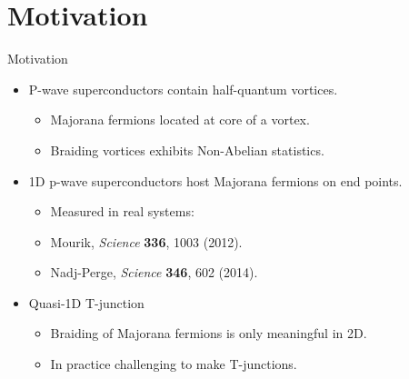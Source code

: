 \documentclass[xcolor=dvipsnames,10pt,aspectratio=169]{beamer}
\newcommand{\MO}{Motivation}
\begin{document}
  \section{\MO}
  \begin{frame}{\MO}{}

    \begin{multicols}{2}

    \begin{itemize}
      \item P-wave superconductors contain half-quantum vortices.
        \begin{itemize}
          \item Majorana fermions located at core of a vortex.
          \item Braiding vortices exhibits Non-Abelian statistics.
        \end{itemize}
      \item 1D p-wave superconductors host Majorana fermions on end points.
        \begin{itemize}
          \item Measured in real systems:
          \item[] \hspace{0.45em}\scriptsize Mourik, \textit{Science} \textbf{336}, 1003 (2012).
          \item[] \hspace{0.50em}\scriptsize Nadj-Perge, \textit{Science} \textbf{346}, 602 (2014).
        \end{itemize}
      \item Quasi-1D T-junction
        \begin{itemize}
          \item Braiding of Majorana fermions is only meaningful in 2D.
          \item In practice challenging to make T-junctions.
        \end{itemize}
    \end{itemize}

    \begin{figure}
      \end{figure}
    \end{multicols}

  \end{frame}
\end{document}
